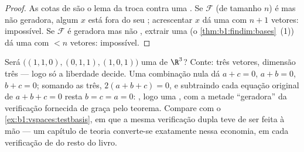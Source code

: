 \begin{proof}
As cotas de  são o lema da troca contra uma . Se
$\mathcal{F}$ (de tamanho $n$) é  mas não geradora, algum $x$ está
fora do seu ; acrescentar $x$ dá uma  com
$n + 1$ vetores: impossível. Se $\mathcal{F}$ é geradora mas não ,
extrair uma  (o \cref{thm:b1:findim:bases}~(1)) dá uma  com $< n$ vetores:
impossível.
\end{proof}

\begin{example}
\label{ex:b1:findim:twoofthreerun}
Será $\bigl((1,1,0), (0,1,1), (1,0,1)\bigr)$ uma  de $\R^3$?
Conte: três vetores, dimensão três --- logo só a liberdade decide.
Uma combinação nula dá $a + c = 0$, $a + b = 0$, $b +
c = 0$; somando as três, $2(a + b + c) = 0$,
e subtraindo cada equação original de $a + b + c = 0$ resta $b = c = a =
0$: ,
logo uma , com a metade ``geradora'' da verificação fornecida
de graça pelo teorema. Compare com o \cref{ex:b1:vspaces:testbasis}, em que a mesma
verificação dupla teve de ser feita à mão --- um capítulo de teoria
converte-se exatamente nessa economia, em cada verificação de 
do resto do livro.
\end{example}

